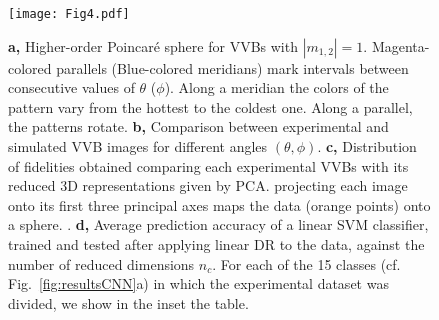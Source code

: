 \documentclass[
	aps, prl, superscriptaddress, twocolumn,
	10pt
	floatfix, 
    nofootinbib,
	tightenlines
]{revtex4-1}
\begin{document}
\begin{figure}[t]
    \centering
    \texttt{[image: Fig4.pdf]}
    \caption{
    \textbf{a,}
    Higher-order Poincar\'e sphere for \ac{VVB}s with $|m_{1,2}|=1$. Magenta-colored parallels (Blue-colored meridians) mark intervals between consecutive values of $\theta$ ($\phi$). 
    Along a meridian the colors of the pattern vary from the hottest to the coldest one. Along a parallel, the patterns rotate. 
    \textbf{b,}
    Comparison between experimental and simulated \ac{VVB} images for different angles $(\theta, \phi)$.
    \textbf{c,}
    Distribution of fidelities obtained comparing each experimental VVBs with its reduced 3D representations given by PCA.
    projecting each image onto its first three principal axes  maps the data (orange points) onto a sphere. .
    \textbf{d,}
    Average prediction accuracy  of a linear SVM classifier, trained and tested after applying linear DR to the data, against the number of reduced dimensions $n_c$.
    For each of the 15 classes (cf. Fig.~\ref{fig:resultsCNN}a) in which the experimental dataset was divided, we show in the inset the  table. 
    }%
    \label{fig:PCAresults}
\end{figure}
\end{document}
